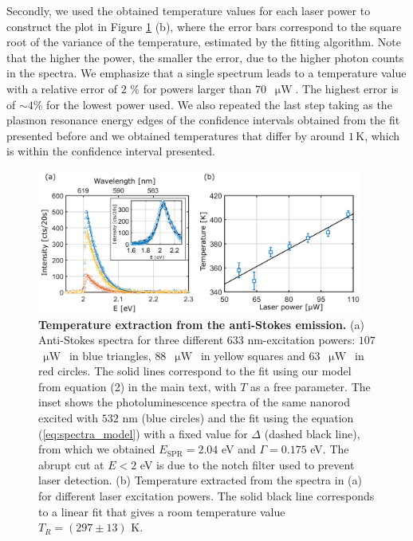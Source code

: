 \documentclass[journal=nalefd,manuscript=letter]{achemso}
\newcommand{\K}{\ensuremath{\,\textrm{K}}}
\newcommand{\uW}{\ensuremath{\,\upmu\textrm{W}}}
\begin{document}
Secondly, we used the obtained temperature values for each laser power to construct the plot in Figure 
\ref{fig:as_fit} (b), where the error bars correspond to the square root of the variance of 
the temperature, estimated by the fitting algorithm.
Note that the higher the power, the smaller the error, due to the higher photon counts in 
the spectra. We emphasize that a single spectrum leads to a temperature value with a 
relative error of $2$ \% for powers larger than $70$ \uW. The highest error is of $\sim 4\%$ for the 
lowest power used. We also repeated the last step taking
as the plasmon resonance energy edges of the confidence intervals obtained from the fit presented
before and we obtained temperatures that differ by around $1\K$, which is within the confidence interval
presented. 

\begin{figure}[htp] \centering
\includegraphics[width=0.95\textwidth]{Figures/Supplementary/09_Error_vs_Wavelength/Temp_error.png}
\caption{\textbf{Temperature extraction from the anti-Stokes emission.} 
(a) Anti-Stokes spectra for three different $633$ nm-excitation powers: $107$ \uW~in 
blue triangles, $88$ \uW~in yellow squares and $63$ \uW~in red circles. 
The solid lines correspond to the fit using our model from equation (2) in the main text, 
with $T$ as a free parameter. The inset shows the photoluminescence spectra of the same 
nanorod excited with $532$ nm (blue circles) and the fit using the equation 
(\ref{eq:spectra_model}) with a fixed value for $\Delta$ (dashed black line), from which 
we obtained $E_\textrm{SPR}=2.04$ eV and $\Gamma=0.175$ eV. The abrupt cut at $E<2$ eV is due to the
notch filter used to prevent laser detection.  
(b) Temperature extracted from the spectra in (a) for different laser excitation powers. 
The solid black line corresponds to a linear fit that gives a room temperature value $T_R = (297 \pm 13)$ K.}
\label{fig:as_fit}
\end{figure}
\end{document}
